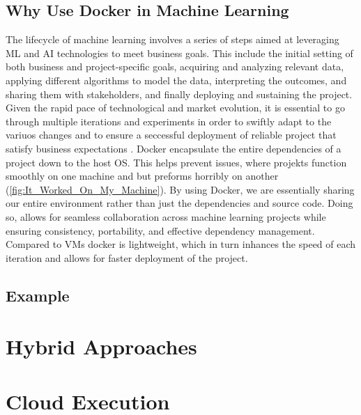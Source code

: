 \subsection{Why Use Docker in Machine Learning}
The lifecycle of machine learning involves a series of steps aimed at leveraging \ac{ML} and \ac{AI} technologies to meet business goals. 
This include the initial setting of both business and project-specific goals, acquiring and analyzing relevant data, applying different algorithms to model the data, interpreting the outcomes, and sharing them with stakeholders, and finally deploying and sustaining the project.
Given the rapid pace of technological and market evolution, it is essential to go through multiple iterations and experiments in order to swiftly adapt to the variuos changes and to ensure a seccessful deployment of reliable project that satisfy business expectations \cite{Docker_Archi}.
\newline
Docker encapsulate the entire dependencies of a project down to the host \ac*{OS}. This helps prevent issues, 
where projekts function smoothly on one machine and but preforms horribly on another (\autoref{fig:It_Worked_On_My_Machine}). 
By using Docker, we are essentially sharing our entire environment rather than just the dependencies and source code. 
Doing so, allows for seamless collaboration across machine learning projects while ensuring consistency, portability, and effective dependency management. 
Compared to \ac*{VMs} docker is lightweight, which in turn inhances the speed of each iteration and allows for faster deployment of the project.


\subsection{Example}

\newpage

\section{Hybrid Approaches}

\section{Cloud Execution}
